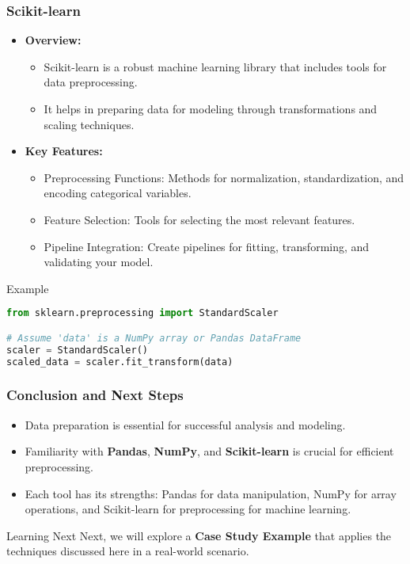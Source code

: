 \documentclass{beamer}
\begin{document}
\begin{frame}[fragile]
    \frametitle{Scikit-learn}
    \begin{itemize}
        \item \textbf{Overview:} 
        \begin{itemize}
            \item Scikit-learn is a robust machine learning library that includes tools for data preprocessing.
            \item It helps in preparing data for modeling through transformations and scaling techniques.
        \end{itemize}

        \item \textbf{Key Features:} 
        \begin{itemize}
            \item Preprocessing Functions: Methods for normalization, standardization, and encoding categorical variables.
            \item Feature Selection: Tools for selecting the most relevant features.
            \item Pipeline Integration: Create pipelines for fitting, transforming, and validating your model.
        \end{itemize}
    \end{itemize}

    \begin{block}{Example}
    \begin{lstlisting}[language=Python]
from sklearn.preprocessing import StandardScaler

# Assume 'data' is a NumPy array or Pandas DataFrame
scaler = StandardScaler()
scaled_data = scaler.fit_transform(data)
    \end{lstlisting}
    \end{block}
\end{frame}

\begin{frame}
    \frametitle{Conclusion and Next Steps}
    \begin{itemize}
        \item Data preparation is essential for successful analysis and modeling.
        \item Familiarity with \textbf{Pandas}, \textbf{NumPy}, and \textbf{Scikit-learn} is crucial for efficient preprocessing.
        \item Each tool has its strengths: Pandas for data manipulation, NumPy for array operations, and Scikit-learn for preprocessing for machine learning.
    \end{itemize}
    
    \begin{block}{Learning Next}
        Next, we will explore a \textbf{Case Study Example} that applies the techniques discussed here in a real-world scenario.
    \end{block}
\end{frame}
\end{document}
